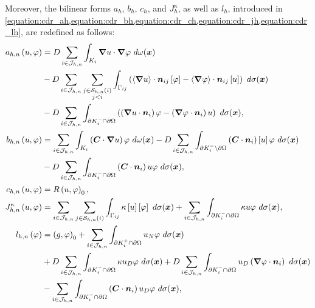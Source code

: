Moreover, the bilinear forms $a_h$, $b_h$, $c_h$, and $J^{\kappa}_h$, as well as $l_h$, introduced in \cref{equation:cdr_ah,equation:cdr_bh,equation:cdr_ch,equation:cdr_jh,equation:cdr_lh}, are redefined as follows:
\begin{align}
    a_{h, n} \left( u, \varphi \right) &= D \sum_{i \in \mathcal{J}_{h, n}} \int_{K_i} \bm{\nabla} u \cdot \bm{\nabla} \varphi ~ d \omega(\bm{x}) \label{equation:cdr_ahn} \\
    &- D \sum_{i \in \mathcal{J}_{h, n}} \sum_{\substack{j \in \mathcal{S}_{h, n}(i) \\ j < i}} \int_{\Gamma_{ij}} \left( \left\langle \bm{\nabla} u \right\rangle \cdot \bm{n}_{ij} \left[ \varphi \right] - \left\langle \bm{\nabla} \varphi \right\rangle \cdot \bm{n}_{ij} \left[ u \right] \right) ~ d \sigma(\bm{x}) \notag \\
    &- D \sum_{i \in \mathcal{J}_{h, n}} \int_{\partial K_i^- \cap \partial \Omega} \left( \left( \bm{\nabla} u \cdot \bm{n}_i \right) \varphi - \left( \bm{\nabla} \varphi \cdot \bm{n}_i \right) u \right) ~ d \sigma(\bm{x}), \notag \\
    b_{h, n} \left( u, \varphi \right) &= \sum_{i \in \mathcal{J}_{h, n}} \int_{K_i} \left( \bm{C} \cdot \bm{\nabla} u \right) \varphi ~ d \omega(\bm{x}) \label{equation:cdr_bhn} - D \sum_{i \in \mathcal{J}_{h, n}} \int_{\partial K_i^- \setminus \partial \Omega} \left( \bm{C} \cdot \bm{n}_i \right) \left[ u \right] \varphi ~ d \sigma(\bm{x}) \\
    &- D \sum_{i \in \mathcal{J}_{h, n}} \int_{\partial K_i^- \cap \partial \Omega} \left( \bm{C} \cdot \bm{n}_i \right) u \varphi ~ d \sigma(\bm{x}), \notag \\
    c_{h, n} \left( u, \varphi \right) &= R \left( u, \varphi \right)_0, \label{equation:cdr_chn} \\
    J^{\kappa}_{h, n} \left( u, \varphi \right) &= \sum_{i \in \mathcal{J}_{h, n}} \sum_{j \in \mathcal{S}_{h, n}(i)} \int_{\Gamma_{ij}} \kappa \left[ u \right] \left[ \varphi \right] ~ d \sigma(\bm{x}) + \sum_{i \in \mathcal{J}_{h, n}} \int_{\partial K_i^- \cap \partial \Omega} \kappa u \varphi ~ d \sigma(\bm{x}), \label{equation:cdr_jhn} \\
    l_{h, n} \left( \varphi \right)  &= \left( g, \varphi \right)_0 + \sum_{i \in \mathcal{J}_{h, n}} \int_{\partial K_i^+ \cap \partial \Omega} u_N \varphi ~ d \sigma(\bm{x}) \label{equation:cdr_lhn} \\
    &+ D \sum_{i \in \mathcal{J}_{h, n}} \int_{\partial K_i^- \cap \partial \Omega} \kappa u_D \varphi ~ d \sigma(\bm{x}) + D \sum_{i \in \mathcal{J}_{h, n}} \int_{\partial K_i^- \cap \partial \Omega} u_D \left( \bm{\nabla} \varphi \cdot \bm{n}_i \right) ~ d \sigma(\bm{x}) \notag \\
    &- \sum_{i \in \mathcal{J}_{h, n}} \int_{\partial K_i^- \cap \partial \Omega} \left( \bm{C} \cdot \bm{n}_i \right) u_D \varphi ~ d \sigma(\bm{x}) \notag,
\end{align}
